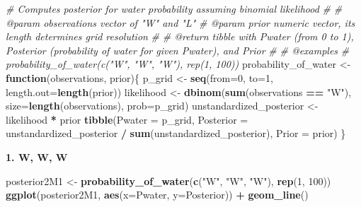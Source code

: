 \documentclass[
]{book}
\newenvironment{Shaded}{\begin{snugshade}}{\end{snugshade}}
\newcommand{\CommentTok}[1]{\textcolor[rgb]{0.56,0.35,0.01}{\textit{#1}}}
\newcommand{\ControlFlowTok}[1]{\textcolor[rgb]{0.13,0.29,0.53}{\textbf{#1}}}
\newcommand{\DataTypeTok}[1]{\textcolor[rgb]{0.13,0.29,0.53}{#1}}
\newcommand{\DecValTok}[1]{\textcolor[rgb]{0.00,0.00,0.81}{#1}}
\newcommand{\KeywordTok}[1]{\textcolor[rgb]{0.13,0.29,0.53}{\textbf{#1}}}
\newcommand{\NormalTok}[1]{#1}
\newcommand{\OperatorTok}[1]{\textcolor[rgb]{0.81,0.36,0.00}{\textbf{#1}}}
\newcommand{\StringTok}[1]{\textcolor[rgb]{0.31,0.60,0.02}{#1}}
\begin{document}
\begin{Shaded}
\begin{Highlighting}[]
\CommentTok{\#\textquotesingle{} Computes posterior for water probability assuming binomial likelihood}
\CommentTok{\#\textquotesingle{}}
\CommentTok{\#\textquotesingle{} @param observations vector of "W" and "L"}
\CommentTok{\#\textquotesingle{} @param prior numeric vector, its length determines grid resolution}
\CommentTok{\#\textquotesingle{}}
\CommentTok{\#\textquotesingle{} @return tibble with Pwater (from 0 to 1), Posterior (probability of water for given Pwater), and Prior}
\CommentTok{\#\textquotesingle{}}
\CommentTok{\#\textquotesingle{} @examples}
\CommentTok{\#\textquotesingle{} probability\_of\_water(c("W", "W", "W"), rep(1, 100))}
\NormalTok{probability\_of\_water \textless{}{-}}\StringTok{ }\ControlFlowTok{function}\NormalTok{(observations, prior)\{}
\NormalTok{  p\_grid \textless{}{-}}\StringTok{ }\KeywordTok{seq}\NormalTok{(}\DataTypeTok{from=}\DecValTok{0}\NormalTok{, }\DataTypeTok{to=}\DecValTok{1}\NormalTok{, }\DataTypeTok{length.out=}\KeywordTok{length}\NormalTok{(prior))}
\NormalTok{  likelihood \textless{}{-}}\StringTok{ }\KeywordTok{dbinom}\NormalTok{(}\KeywordTok{sum}\NormalTok{(observations }\OperatorTok{==}\StringTok{ "W"}\NormalTok{), }\DataTypeTok{size=}\KeywordTok{length}\NormalTok{(observations), }\DataTypeTok{prob=}\NormalTok{p\_grid)}
\NormalTok{  unstandardized\_posterior \textless{}{-}}\StringTok{ }\NormalTok{likelihood }\OperatorTok{*}\StringTok{ }\NormalTok{prior}
  \KeywordTok{tibble}\NormalTok{(}\DataTypeTok{Pwater =}\NormalTok{ p\_grid,}
         \DataTypeTok{Posterior =}\NormalTok{ unstandardized\_posterior }\OperatorTok{/}\StringTok{ }\KeywordTok{sum}\NormalTok{(unstandardized\_posterior),}
         \DataTypeTok{Prior =}\NormalTok{ prior)}
\NormalTok{\}}
\end{Highlighting}
\end{Shaded}

\textbf{1. W, W, W}

\begin{Shaded}
\begin{Highlighting}[]
\NormalTok{posterior2M1 \textless{}{-}}\StringTok{ }\KeywordTok{probability\_of\_water}\NormalTok{(}\KeywordTok{c}\NormalTok{(}\StringTok{"W"}\NormalTok{, }\StringTok{"W"}\NormalTok{, }\StringTok{"W"}\NormalTok{), }\KeywordTok{rep}\NormalTok{(}\DecValTok{1}\NormalTok{, }\DecValTok{100}\NormalTok{))}
\KeywordTok{ggplot}\NormalTok{(posterior2M1, }\KeywordTok{aes}\NormalTok{(}\DataTypeTok{x=}\NormalTok{Pwater, }\DataTypeTok{y=}\NormalTok{Posterior)) }\OperatorTok{+}\StringTok{ }
\StringTok{  }\KeywordTok{geom\_line}\NormalTok{()}
\end{Highlighting}
\end{Shaded}
\end{document}
